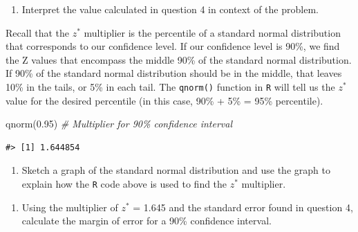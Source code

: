 \documentclass[
]{report}
\newenvironment{Shaded}{\begin{snugshade}}{\end{snugshade}}
\newcommand{\CommentTok}[1]{\textcolor[rgb]{0.56,0.35,0.01}{\textit{#1}}}
\newcommand{\FloatTok}[1]{\textcolor[rgb]{0.00,0.00,0.81}{#1}}
\newcommand{\FunctionTok}[1]{\textcolor[rgb]{0.00,0.00,0.00}{#1}}
\newcommand{\NormalTok}[1]{#1}
\providecommand{\tightlist}{%
  \setlength{\itemsep}{0pt}\setlength{\parskip}{0pt}}
\begin{document}
\vspace{1in}

\begin{enumerate}
\def\labelenumi{\arabic{enumi}.}
\setcounter{enumi}{4}
\tightlist
\item
  Interpret the value calculated in question 4 in context of the problem.
\end{enumerate}

\vspace{1in}
\newpage

Recall that the \(z^*\) multiplier is the percentile of a standard normal distribution that corresponds to our confidence level. If our confidence level is 90\%, we find the Z values that encompass the middle 90\% of the standard normal distribution. If 90\% of the standard normal distribution should be in the middle, that leaves 10\% in the tails, or 5\% in each tail. The \texttt{qnorm()} function in \texttt{R} will tell us the \(z^*\) value for the desired percentile (in this case, 90\% + 5\% = 95\% percentile).

\begin{Shaded}
\begin{Highlighting}[]
\FunctionTok{qnorm}\NormalTok{(}\FloatTok{0.95}\NormalTok{) }\CommentTok{\# Multiplier for 90\% confidence interval}
\end{Highlighting}
\end{Shaded}

\begin{verbatim}
#> [1] 1.644854
\end{verbatim}

\begin{enumerate}
\def\labelenumi{\arabic{enumi}.}
\setcounter{enumi}{5}
\tightlist
\item
  Sketch a graph of the standard normal distribution and use the graph to explain how the \texttt{R} code above is used to find the \(z^*\) multiplier.
\end{enumerate}

\vspace{1.5in}

\begin{enumerate}
\def\labelenumi{\arabic{enumi}.}
\setcounter{enumi}{6}
\tightlist
\item
  Using the multiplier of \(z^*\) = 1.645 and the standard error found in question 4, calculate the margin of error for a 90\% confidence interval.
\end{enumerate}

\vspace{0.5in}
\end{document}
